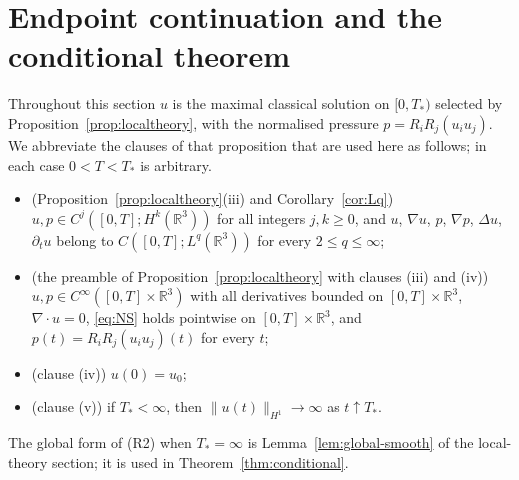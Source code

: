 \documentclass[11pt]{article}
\theoremstyle{definition}
\theoremstyle{plain}
\newcommand{\R}{\mathbb R}
\newcommand{\norm}[1]{\lVert #1\rVert}
\begin{document}
\section{Endpoint continuation and the conditional theorem}
\label{sec:continuation}

Throughout this section $u$ is the maximal classical solution on $[0,T_*)$
selected by Proposition~\ref{prop:localtheory}, with the normalised pressure
$p=R_iR_j(u_iu_j)$.  We abbreviate the clauses of that proposition that are
used here as follows; in each case $0<T<T_*$ is arbitrary.
\begin{itemize}
\item[(R1)] (Proposition~\ref{prop:localtheory}(iii) and
 Corollary~\ref{cor:Lq}) $u,p\in C^j([0,T];H^k(\R^3))$ for all integers
 $j,k\geq0$, and $u$, $\nabla u$, $p$, $\nabla p$, $\Delta u$, $\partial_tu$
 belong to $C([0,T];L^q(\R^3))$ for every $2\leq q\leq\infty$;
\item[(R2)] (the preamble of Proposition~\ref{prop:localtheory} with clauses
 (iii) and (iv)) $u,p\in C^\infty([0,T]\times\R^3)$ with all derivatives
 bounded on $[0,T]\times\R^3$, $\nabla\cdot u=0$, \eqref{eq:NS} holds
 pointwise on $[0,T]\times\R^3$, and $p(t)=R_iR_j(u_iu_j)(t)$ for every $t$;
\item[(R3)] (clause (iv)) $u(0)=u_0$;
\item[(R4)] (clause (v)) if $T_*<\infty$, then $\norm{u(t)}_{H^1}\to\infty$
 as $t\uparrow T_*$.
\end{itemize}
The global form of (R2) when $T_*=\infty$ is Lemma~\ref{lem:global-smooth}
of the local-theory section; it is used in Theorem~\ref{thm:conditional}.
\end{document}
